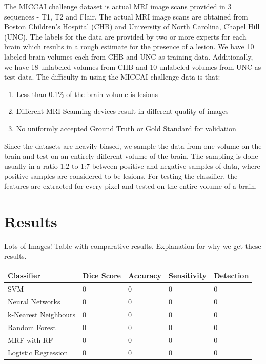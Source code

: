 \documentclass{article} %
\begin{document}
The MICCAI challenge dataset is actual MRI image scans provided in 3 sequences - T1, T2 and Flair. The actual MRI image scans are obtained from Boston Children's Hospital (CHB) and University of North Carolina, Chapel Hill (UNC). The labels for the data are provided by two or more experts for each brain which results in a rough estimate for the presence of a lesion. We have 10 labeled brain volumes each from CHB and UNC as training data. Additionally, we have 18 unlabeled volumes from CHB and 10 unlabeled volumes from UNC as test data. The difficulty in using the MICCAI challenge data is that:
\begin{enumerate}
\item Less than 0.1\% of the brain volume is lesions
\item Different MRI Scanning devices result in different quality of images
\item No uniformly accepted Ground Truth or Gold Standard for validation
\end{enumerate}

Since the datasets are heavily biased, we sample the data from one volume on the brain and test on an entirely different volume of the brain. The sampling is done usually in a ratio 1:2 to 1:7 between positive and negative samples of data, where positive samples are considered to be lesions. For testing the classifier, the features are extracted for every pixel and tested on the entire volume of a brain.  

\section{Results}
Lots of Images! Table with comparative results. Explanation for why we get these results. 

\begin{center}
\centering
\begin{tabular}{ | m{7em} | m{2cm}| m{2cm} | m{2cm} | m{2cm} | } 
\hline
\textbf{Classifier} & \textbf{Dice Score} & \textbf{Accuracy} & \textbf{Sensitivity} & \textbf{Detection}\\ 
\hline
SVM & 0 & 0 & 0 & 0  \\ 
\hline
Neural Networks & 0 & 0 & 0 & 0 \\ 
\hline
k-Nearest Neighbours & 0 & 0 & 0 & 0 \\ 
\hline
Random Forest & 0 & 0 & 0 & 0 \\ 
\hline
MRF with RF & 0 & 0 & 0 & 0 \\ 
\hline
Logistic Regression & 0 & 0 & 0 & 0 \\ 
\hline
\end{tabular}
\end{center}
\end{document}
